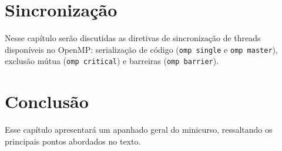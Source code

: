 \documentclass{SBCbookchapter}
\begin{document}
\section{Sincronização}

Nesse capítulo serão discutidas as diretivas de sincronização de threads disponíveis no OpenMP: serialização de código (\texttt{omp single} e \texttt{omp master}), exclusão mútua (\texttt{omp critical}) e barreiras (\texttt{omp barrier}).

\section{Conclusão}

Esse capítulo apresentará um apanhado geral do minicurso, ressaltando os principais pontos abordados no texto.
\end{document}
